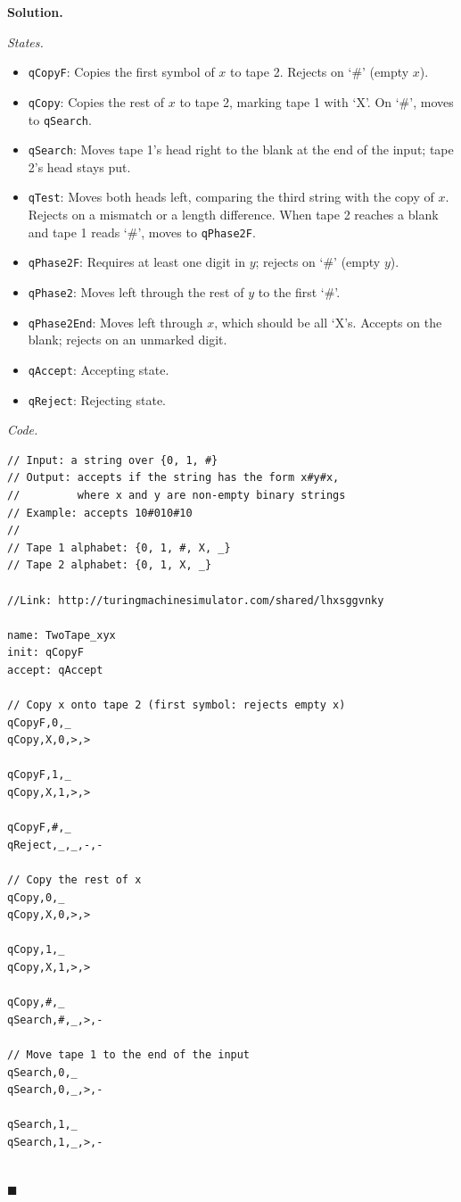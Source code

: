 \documentclass[11pt]{article}
\newenvironment{solution}{%
  \par\noindent\textbf{Solution.}\ \normalfont
}{\hfill$\blacksquare$\par\medskip}
\theoremstyle{plain}
\theoremstyle{definition}
\begin{document}
\begin{solution}
\emph{States.}
\begin{itemize}
  \item \texttt{qCopyF}: Copies the first symbol of $x$ to tape 2. Rejects on `\#' (empty $x$).
  \item \texttt{qCopy}: Copies the rest of $x$ to tape 2, marking tape 1 with `X'. On `\#', moves to \texttt{qSearch}.
  \item \texttt{qSearch}: Moves tape 1's head right to the blank at the end of the input; tape 2's head stays put.
  \item \texttt{qTest}: Moves both heads left, comparing the third string with the copy of $x$. Rejects on a mismatch or a length difference. When tape 2 reaches a blank and tape 1 reads `\#', moves to \texttt{qPhase2F}.
  \item \texttt{qPhase2F}: Requires at least one digit in $y$; rejects on `\#' (empty $y$).
  \item \texttt{qPhase2}: Moves left through the rest of $y$ to the first `\#'.
  \item \texttt{qPhase2End}: Moves left through $x$, which should be all `X's. Accepts on the blank; rejects on an unmarked digit.
  \item \texttt{qAccept}: Accepting state.
  \item \texttt{qReject}: Rejecting state.
\end{itemize}

\emph{Code.}
\begin{lstlisting}
// Input: a string over {0, 1, #}
// Output: accepts if the string has the form x#y#x,
//         where x and y are non-empty binary strings
// Example: accepts 10#010#10
//
// Tape 1 alphabet: {0, 1, #, X, _}
// Tape 2 alphabet: {0, 1, X, _}

//Link: http://turingmachinesimulator.com/shared/lhxsggvnky

name: TwoTape_xyx
init: qCopyF
accept: qAccept

// Copy x onto tape 2 (first symbol: rejects empty x)
qCopyF,0,_
qCopy,X,0,>,>

qCopyF,1,_
qCopy,X,1,>,>

qCopyF,#,_
qReject,_,_,-,-

// Copy the rest of x
qCopy,0,_
qCopy,X,0,>,>

qCopy,1,_
qCopy,X,1,>,>

qCopy,#,_
qSearch,#,_,>,-

// Move tape 1 to the end of the input
qSearch,0,_
qSearch,0,_,>,-

qSearch,1,_
qSearch,1,_,>,-


\end{lstlisting}
\end{solution}
\end{document}
